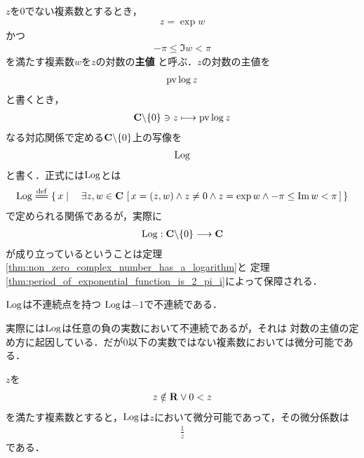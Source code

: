 	$z$を$0$でない複素数とするとき，
	\begin{align}
		z = \exp{w}
	\end{align}
	かつ
	\begin{align}
		-\pi \leq \Im{w} < \pi
	\end{align}
	を満たす複素数$w$を$z$の対数の{\bf 主値}
	と呼ぶ．$z$の対数の主値を
	\begin{align}
		\operatorname{pv}{\log{z}}
	\end{align}
	と書くとき，
	\begin{align}
		\mathbf{C} \backslash \{0\} \ni z \longmapsto \operatorname{pv}{\log{z}}
	\end{align}
	なる対応関係で定める$\mathbf{C} \backslash \{0\}$上の写像を
	\begin{align}
		\operatorname{Log}
	\end{align}
	と書く．正式には$\operatorname{Log}$とは
	\begin{align}
		\pvlog \defeq \Set{x}{\exists z,w \in \C\,
		\left[\, x=(z,w) \wedge z \neq 0 \wedge z = \exp{w} \wedge
		-\pi \leq \Im{w} < \pi\, \right]}
	\end{align}
	で定められる関係であるが，実際に
	\begin{align}
		\operatorname{Log}: \mathbf{C} \backslash \{0\} \longrightarrow \mathbf{C}
	\end{align}
	が成り立っているということは定理\ref{thm:non_zero_complex_number_has_a_logarithm}と
	定理\ref{thm:period_of_exponential_function_is_2_pi_i}によって保障される．
	
	\begin{itembox}[l]{$\operatorname{Log}$は不連続点を持つ}
		$\operatorname{Log}$は$-1$で不連続である．
	\end{itembox}
	
	
	
	実際には$\operatorname{Log}$は任意の負の実数において不連続であるが，それは
	対数の主値の定め方に起因している．だが$0$以下の実数ではない複素数においては微分可能である．
	
	\begin{screen}
		\begin{thm}
		\label{thm:pv_log_is_holomorphic}
			$z$を
			\begin{align}
				z \notin \mathbf{R} \vee 0 < z
			\end{align}
			を満たす複素数とすると，$\operatorname{Log}$は$z$において微分可能であって，その微分係数は
			\begin{align}
				\frac{1}{z}
			\end{align}
			である．
		\end{thm}
	\end{screen}
	
